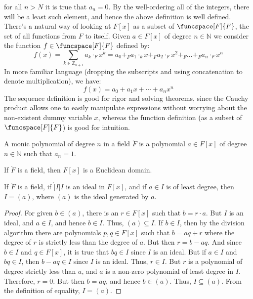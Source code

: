     for all $n>N$ it is true that $a_{n}=0$. By the well-ordering all of the
    integers, there will be a least such element, and hence the above
    definition is well defined. There's a natural way of looking at
    $F[x]$ as a subset of $\funcspace[F]{F}$, the set of all functions from
    $F$ to itself. Given $a\in{F}[x]$ of degree $n\in\mathbb{N}$ we consider
    the function $f\in\funcspace[F]{F}$ defined by:
    \begin{equation}
        f(x)=\sum_{k\in\mathbb{Z}_{n+1}}a_{k}\cdot_{F}x^{k}
        =a_{0}+_{F}a_{1}\cdot_{k}x+_{F}a_{2}\cdot_{F}x^{2}+_{F}\dots
        +_{F}a_{n}\cdot_{F}x^{n}
    \end{equation}
    In more familiar language (dropping the subscripts and using
    concatenation to denote multiplication), we have:
    \begin{equation}
        f(x)=a_{0}+a_{1}x+\cdots+a_{n}x^{n}
    \end{equation}
    The sequence definition is good for rigor and solving theorems, since
    the Cauchy product allows one to easily manipulate expressions without
    worrying about the non-existent dummy variable $x$, whereas the function
    definition (as a subset of $\funcspace[F]{F}$) is good for intuition.
    \begin{definition}
        A monic polynomial of degree $n$ in a field $\ring{F}$ is a
        polynomial $a\in{F}[x]$ of degree $n\in\mathbb{N}$ such that
        $a_{n}=1$.
    \end{definition} 
    \begin{theorem}
        If $\ring{F}$ is a field, then $F[x]$ is a Euclidean domain.
    \end{theorem}
    \begin{theorem}
        If $\ring{F}$ is a field, if $\ring[I]{I}$ is an ideal in $F[x]$,
        and if $a\in{I}$ is of least degree, then $I=(a)$, where $(a)$ is
        the ideal generated by $a$.
    \end{theorem}
    \begin{proof}
        For given $b\in(a)$, there is an $r\in{F}[x]$ such that
        $b=r\cdot{a}$. But $I$ is an ideal, and $a\in{I}$, and hence
        $b\in{I}$. Thus, $(a)\subseteq{I}$. If $b\in{I}$, then by the
        division algorithm there are polynomials $p,q\in{F}[x]$ such that
        $b=aq+r$ where the degree of $r$ is strictly less than the degree of
        $a$. But then $r=b-aq$. And since $b\in{I}$ and $q\in{F}[x]$, it is
        true that $bq\in{I}$ since $I$ is an ideal. But if $a\in{I}$ and
        $bq\in{I}$, then $b-aq\in{I}$ since $I$ is an ideal. Thus,
        $r\in{I}$. But $r$ is a polynomial of degree strictly less than
        $a$, and $a$ is a non-zero polynomial of least degree in $I$.
        Therefore, $r=0$. But then $b=aq$, and hence $b\in(a)$. Thus,
        $I\subseteq(a)$. From the definition of equality, $I=(a)$.
    \end{proof}
